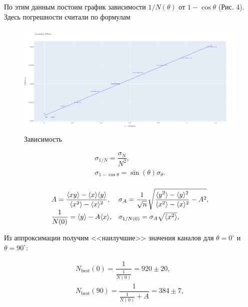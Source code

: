 \documentclass[15pt,a5paper,reqno]{article}
\begin{document}
По этим данным постоим график зависимости $1/N(\theta)$ от $1-\cos \theta$ (Рис. 4). Здесь погрешности считали по формулам

\begin{figure}[h!]
  \centering
  \includegraphics[width=1.0\linewidth]{pics/graph1.png}
  \caption{Зависимость }
  \label{}
\end{figure}

\[\begin{array}{l}
\sigma_{1/N} = \dfrac{\sigma_N}{N^2},\\
\sigma_{1-\cos \theta} = \sin(\theta) \sigma_\theta.\\
\end{array}\]



\[\begin{array}{l l}
A = \dfrac{\langle xy \rangle - \langle x \rangle \langle y \rangle}{\langle x^2 \rangle - \langle x \rangle^2}, & \sigma_A = \dfrac{1}{\sqrt{n}}\sqrt{\dfrac{\langle y^2 \rangle - \langle y \rangle^2}{\langle x^2 \rangle - \langle x \rangle^2} - A^2},\\
\dfrac{1}{N(0)} = \langle y \rangle - A \langle x \rangle, & \sigma_{1/N(0)} = \sigma_A \sqrt{\langle x^2\rangle},\\
\end{array}\]


Из аппроксимации получим <<наилучшие>> значения каналов для $\theta = 0^\circ$ и $\theta = 90^\circ$:

\[\begin{array}{l}
N_{\text{best}}(0) = \dfrac{1}{\frac{1}{N(0)}} = 920 \pm 20,\\[12pt]
N_{\text{best}}(90) = \dfrac{1}{\frac{1}{N(0)}+A} = 384 \pm 7,\\
\end{array}
\]
\end{document}
